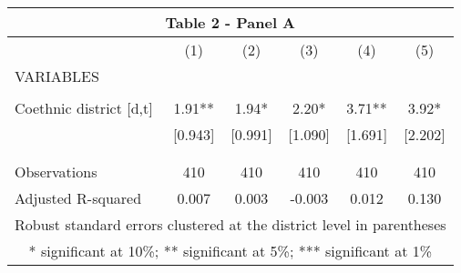 \begin{tabular}{lccccc}
\multicolumn{6}{c}{Table 2 - Panel A} \\ \hline
 & (1) & (2) & (3) & (4) & (5) \\
VARIABLES &  &  &  &  &  \\ \hline
 &  &  &  &  &  \\
Coethnic district [d,t] & 1.91** & 1.94* & 2.20* & 3.71** & 3.92* \\
 & [0.943] & [0.991] & [1.090] & [1.691] & [2.202] \\
 &  &  &  &  &  \\
 &  &  &  &  &  \\
Observations & 410 & 410 & 410 & 410 & 410 \\
 Adjusted R-squared & 0.007 & 0.003 & -0.003 & 0.012 & 0.130 \\ \hline
\multicolumn{6}{c}{ Robust standard errors clustered at the district level in parentheses} \\
\multicolumn{6}{c}{ * significant at 10\%; ** significant at 5\%; *** significant at 1\%} \\
\end{tabular}
